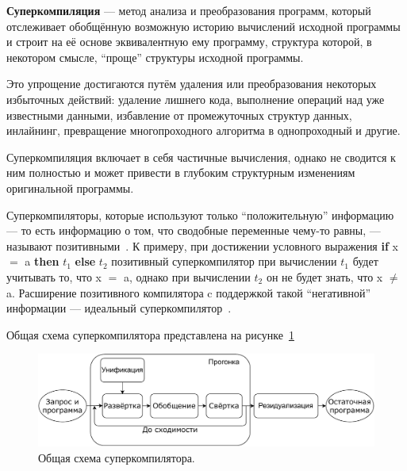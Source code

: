 {\bf Суперкомпиляция} --- метод анализа и преобразования программ,
который отслеживает обобщённую возможную историю вычислений исходной программы и строит
на её основе эквивалентную ему программу, структура которой, в некотором смысле, ``проще''
структуры исходной программы\cite{turchinSC}. %

Это упрощение достигаются путём удаления или преобразования
некоторых избыточных действий: удаление лишнего кода, выполнение операций над
уже известными данными, избавление от промежуточных структур данных, инлайнинг,
превращение многопроходного алгоритма в однопроходный и другие.

Суперкомпиляция включает в себя частичные вычисления, однако не сводится к ним полностью
и может привести в глубоким структурным изменениям оригинальной программы.

Суперкомпиляторы, которые используют только ``положительную'' информацию
--- то есть информацию о том, что сводобные переменные чему-то равны, ---
называют позитивными~\cite{scPos}.
К примеру, при достижении условного выражения {\bf if} x $=$ a {\bf then} $t_1$ {\bf else} $t_2$
позитивный суперкомпилятор при вычислении $t_1$ будет учитывать то, что x $=$ a,
однако при вычислении $t_2$ он не будет знать, что x $\neq$ a.
Расширение позитивного компилятора c поддержкой такой ``негативной'' информации --- идеальный
суперкомпилятор~\cite{scPerf}.

Общая схема суперкомпилятора представлена на рисунке~\ref{fig:scompScheme}

\begin{figure}
\center
\includegraphics[scale=0.8]{./review/scompflow.pdf}
\caption{Общая схема суперкомпилятора.}
\label{fig:scompScheme}
\end{figure}



